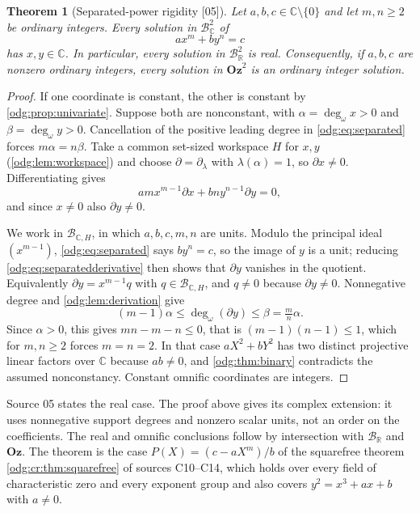 \documentclass[11pt,oneside]{article}
\numberwithin{equation}{section}
\newtheorem{theorem}{Theorem}[section]
\theoremstyle{definition}
\theoremstyle{remark}
\newcommand{\Oz}{\mathbf{Oz}}
\newcommand{\R}{\mathbb R}
\newcommand{\C}{\mathbb C}
\newcommand{\BR}{\mathcal B_{\R}}
\newcommand{\BC}{\mathcal B_{\C}}
\newcommand{\ddeg}{\operatorname{deg}_{\omega}}
\newcommand{\src}[1]{\textup{\textsf{\small[#1]}}}
\begin{document}
\begin{theorem}[Separated-power rigidity \src{05}]\label{odg:thm:separated}
Let $a,b,c\in\C\setminus\{0\}$ and let $m,n\ge2$ be ordinary integers.
Every solution in $\BC^2$ of
\begin{equation}\label{odg:eq:separated}
 a x^m+b y^n=c
\end{equation}
has $x,y\in\C$. In particular, every solution in $\BR^2$ is real.
Consequently, if $a,b,c$ are nonzero ordinary integers,
every solution in $\Oz^2$ is an ordinary integer solution.
\end{theorem}
\begin{proof}
If one coordinate is constant, the other is constant by
\cref{odg:prop:univariate}. Suppose both are nonconstant, with
$\alpha=\ddeg x>0$ and $\beta=\ddeg y>0$. Cancellation of the positive leading
degree in \eqref{odg:eq:separated} forces $m\alpha=n\beta$. Take a common
set-sized workspace $H$ for $x,y$ (\cref{odg:lem:workspace}) and choose
$\partial=\partial_\lambda$ with $\lambda(\alpha)=1$, so $\partial x\ne0$.
Differentiating gives
\begin{equation}\label{odg:eq:separatedderivative}
 amx^{m-1}\partial x+bny^{n-1}\partial y=0,
\end{equation}
and since $x\ne0$ also $\partial y\ne0$.

We work in $\mathcal B_{\C,H}$, in which $a,b,c,m,n$ are units. Modulo the
principal ideal $(x^{m-1})$, \eqref{odg:eq:separated} says $by^n=c$, so the
image of $y$ is a unit; reducing \eqref{odg:eq:separatedderivative} then
shows that $\partial y$ vanishes in the quotient. Equivalently
$\partial y=x^{m-1}q$ with $q\in\mathcal B_{\C,H}$, and $q\ne0$ because
$\partial y\ne0$. Nonnegative degree and \cref{odg:lem:derivation} give
\[
 (m-1)\alpha\le\ddeg(\partial y)\le\beta=\tfrac mn\alpha .
\]
Since $\alpha>0$, this gives $mn-m-n\le0$, that is $(m-1)(n-1)\le1$, which
for $m,n\ge2$ forces $m=n=2$. In that case $aX^2+bY^2$ has two distinct
projective linear factors over $\C$ because $ab\ne0$, and
\cref{odg:thm:binary} contradicts the assumed nonconstancy. Constant omnific
coordinates are integers.
\end{proof}

Source 05 states the real case. The proof above gives its complex extension:
it uses nonnegative support degrees and nonzero scalar units, not an order on
the coefficients. The real and omnific conclusions follow by intersection
with $\BR$ and $\Oz$. The theorem is the case $P(X)=(c-aX^m)/b$ of the squarefree
theorem \cref{odg:cr:thm:squarefree} of sources C10--C14, which holds over every
field of characteristic zero and every exponent group and also covers
$y^2=x^3+ax+b$ with $a\ne0$.
\end{document}
